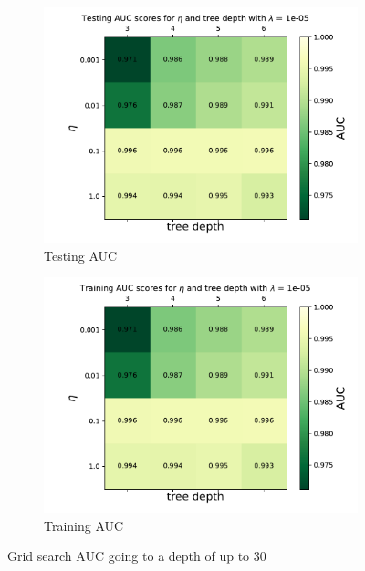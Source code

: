 \documentclass[12pt, a4paper]{book}
\begin{document}
\graphicspath{{../../Plots/XGBoost/FULL/GRIDSEARCH_24-30}}
\begin{figure}[!ht]
\centering
\begin{subfigure}[b]{0.49\textwidth}
      \centering
      \includegraphics[width=1\textwidth]{Testing_AUC.pdf}
      \caption{Testing AUC}
   \end{subfigure}
   \hfill
   \begin{subfigure}[b]{0.49\textwidth}
      \centering
      \includegraphics[width=1\textwidth]{Training_AUC.pdf}
      \caption{Training AUC}
   \end{subfigure}
   \caption{Grid search AUC going to a depth of up to 30}\label{fig:DBDT_GRID_AUC}
\end{figure}
\end{document}
